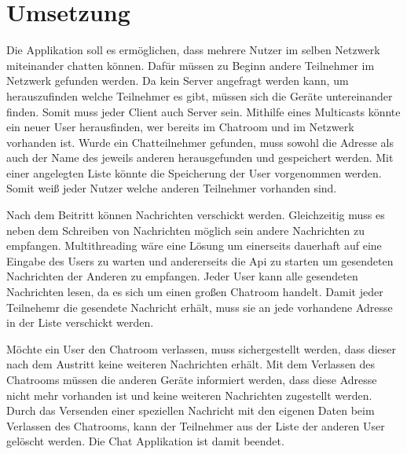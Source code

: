 \section{Umsetzung}
Die Applikation soll es ermöglichen, dass mehrere Nutzer im selben Netzwerk miteinander chatten können. 
Dafür müssen zu Beginn andere Teilnehmer im Netzwerk gefunden werden.
Da kein Server angefragt werden kann, um herauszufinden welche Teilnehmer es gibt, müssen sich die Geräte untereinander finden. 
Somit muss jeder Client auch Server sein.
Mithilfe eines Multicasts könnte ein neuer User herausfinden, wer bereits im Chatroom und im Netzwerk vorhanden ist. 
Wurde ein Chatteilnehmer gefunden, muss sowohl die Adresse als auch der Name des jeweils anderen herausgefunden und gespeichert werden. 
Mit einer angelegten Liste könnte die Speicherung der User vorgenommen werden. Somit weiß jeder Nutzer welche anderen Teilnehmer vorhanden sind. 

Nach dem Beitritt können Nachrichten verschickt werden. 
Gleichzeitig muss es neben dem Schreiben von Nachrichten möglich sein andere Nachrichten zu empfangen. 
Multithreading wäre eine Lösung um einerseits dauerhaft auf eine Eingabe des Users zu warten und andererseits die Api zu starten um gesendeten Nachrichten der Anderen zu empfangen.
Jeder User kann alle gesendeten Nachrichten lesen, da es sich um einen großen Chatroom handelt. 
Damit jeder Teilnehemr die gesendete Nachricht erhält, muss sie an jede vorhandene Adresse in der Liste verschickt werden.

Möchte ein User den Chatroom verlassen, muss sichergestellt werden, dass dieser nach dem Austritt keine weiteren Nachrichten erhält. 
Mit dem Verlassen des Chatrooms müssen die anderen Geräte informiert werden, dass diese Adresse nicht mehr vorhanden ist und keine weiteren Nachrichten zugestellt werden.
Durch das Versenden einer speziellen Nachricht mit den eigenen Daten beim Verlassen des Chatrooms, kann der Teilnehmer aus der Liste der anderen User gelöscht werden. 
Die Chat Applikation ist damit beendet. 
\\
